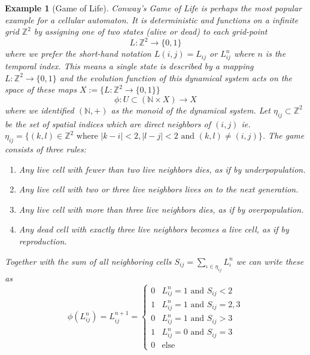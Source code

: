 \documentclass{article}
\newtheorem{example}[definition]{Example}
\begin{document}
\begin{example}[Game of Life]
    \label{example:game-of-life}
    Conway's Game of Life is perhaps the most popular example for a cellular automaton.
    It is deterministic and functions on a infinite grid $\mathbb{Z}^2$ by assigning one of two
    states (alive or dead) to each grid-point
    \begin{equation}
        L:\mathbb{Z}^2\rightarrow\{0,1\}
    \end{equation}
    where we prefer the short-hand notation $L(i,j)=L_{ij}$ or $L^n_{ij}$ where $n$ is the temporal
    index.
    This means a single state is described by a mapping $L:\mathbb{Z}^2\rightarrow\{0,1\}$ and the
    evolution function of this dynamical system acts on the space of these maps
    $X:=\{L:\mathbb{Z}^2\rightarrow\{0,1\}\}$
    \begin{equation}
        \phi:U\subset(\mathbb{N}\times X) \rightarrow X
    \end{equation}
    where we identified $(\mathbb{N},+)$ as the monoid of the dynamical system.
    Let $\eta_{ij}\subset\mathbb{Z}^2$ be the set of spatial indices which are direct neighbors of
    $(i,j)$ ie. $\eta_{ij}=\{(k,l)\in\mathbb{Z}^2 \text{ where } |k-i|<2, |l-j|<2 \text{ and }
    (k,l)\neq(i,j)\}$.
    The game consists of three rules:
    \begin{enumerate}
        \item Any live cell with fewer than two live neighbors dies, as if by underpopulation.
        \item Any live cell with two or three live neighbors lives on to the next generation.
        \item Any live cell with more than three live neighbors dies, as if by overpopulation.
        \item Any dead cell with exactly three live neighbors becomes a live cell, as if by
            reproduction.
    \end{enumerate}
    Together with the sum of all neighboring cells $S_{ij}=\sum\limits_{\iota\in\eta_{ij}}L^n_\iota$
    we can write these as
    \begin{equation}
        \phi(L_{ij}^n) = L_{ij}^{n+1} =
        \begin{cases}
            0 &L^n_{ij}=1 \text{ and } S_{ij}<2\\
            1 &L^n_{ij}=1 \text{ and } S_{ij}=2,3\\
            0 &L^n_{ij}=1 \text{ and } S_{ij}>3\\
            1 &L^n_{ij}=0 \text{ and } S_{ij}=3\\
            0 &\text{else}
        \end{cases}
    \end{equation}
\end{example}
\end{document}
